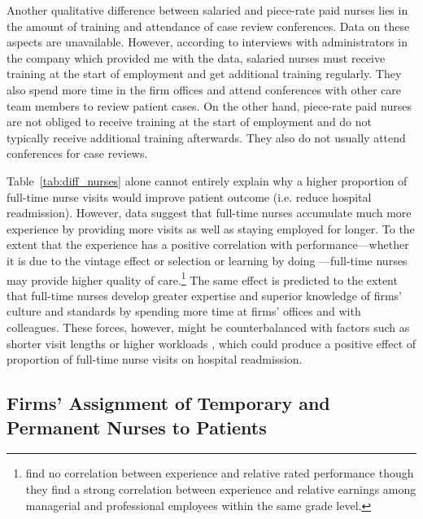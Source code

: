 \documentclass[final,12pt]{article}
\begin{document}
Another qualitative difference between salaried and piece-rate paid nurses lies in the amount of training and attendance of case review conferences. Data on these aspects are unavailable. However, according to interviews with administrators in the company which provided me with the data, salaried nurses must receive training at the start of employment and get additional training regularly. They also spend more time in the firm offices and attend conferences with other care team members to review patient cases. On the other hand, piece-rate paid nurses are not obliged to receive training at the start of employment and do not typically receive additional training afterwards. They also do not usually attend conferences for case reviews.

Table~\ref{tab:diff_nurses} alone cannot entirely explain why a higher proportion of  full-time nurse visits would improve patient outcome (i.e. reduce hospital readmission).
However, data suggest that full-time nurses accumulate much more experience by providing more visits as well as staying employed for longer.
To the extent that the experience has a positive correlation with performance---whether it is due to the vintage effect or selection \citep{Murnane1981} or learning by doing \citep{David2009}---full-time nurses may provide higher quality of care.\footnote{\citet{Medoff1980} find no correlation between experience and relative rated performance though they find a strong correlation between experience and relative earnings among managerial and professional employees within the same grade level.}
The same effect is predicted to the extent that full-time nurses develop greater expertise and superior knowledge of firms' culture and standards by spending more time at firms' offices and with colleagues.
These forces, however, might be counterbalanced with factors such as shorter visit lengths or higher workloads \citep{Brachet2012}, which could produce a positive effect of proportion of full-time nurse visits on hospital readmission.



 \subsection{Firms' Assignment of Temporary and Permanent Nurses to Patients}
\end{document}
